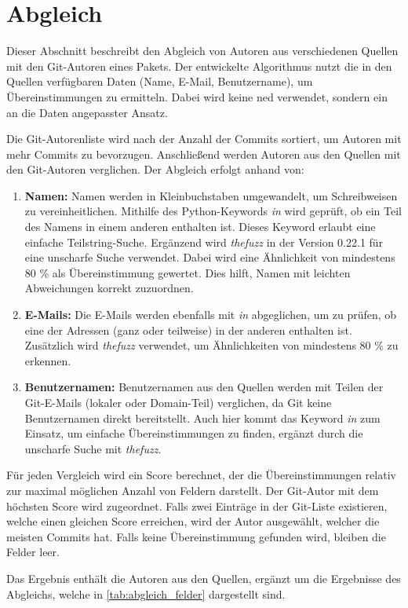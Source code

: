 \section{Abgleich}
\label{sec:abgleich}
Dieser Abschnitt beschreibt den Abgleich von Autoren aus verschiedenen Quellen mit den Git-Autoren eines Pakets.
Der entwickelte Algorithmus nutzt die in den Quellen verfügbaren Daten (Name, E-Mail, Benutzername), um Übereinstimmungen zu ermitteln.
Dabei wird keine \gls{ned} verwendet, sondern ein an die Daten angepasster Ansatz.

Die Git-Autorenliste wird nach der Anzahl der Commits sortiert, um Autoren mit mehr Commits zu bevorzugen.
Anschließend werden Autoren aus den Quellen mit den Git-Autoren verglichen. Der Abgleich erfolgt anhand von:

\begin{enumerate}
    \item \textbf{Namen:} Namen werden in Kleinbuchstaben umgewandelt, um Schreibweisen zu vereinheitlichen. Mithilfe des Python-Keywords \emph{in} wird geprüft, ob ein Teil des Namens in einem anderen enthalten ist. Dieses Keyword erlaubt eine einfache Teilstring-Suche. Ergänzend wird \emph{thefuzz} in der Version 0.22.1 für eine unscharfe Suche verwendet. Dabei wird eine Ähnlichkeit von mindestens 80 \% als Übereinstimmung gewertet. Dies hilft, Namen mit leichten Abweichungen korrekt zuzuordnen.
    \item \textbf{E-Mails:} Die E-Mails werden ebenfalls mit \emph{in} abgeglichen, um zu prüfen, ob eine der Adressen (ganz oder teilweise) in der anderen enthalten ist. Zusätzlich wird \emph{thefuzz} verwendet, um Ähnlichkeiten von mindestens 80 \% zu erkennen.
    \item \textbf{Benutzernamen:} Benutzernamen aus den Quellen werden mit Teilen der Git-E-Mails (lokaler oder Domain-Teil) verglichen, da Git keine Benutzernamen direkt bereitstellt. Auch hier kommt das Keyword \emph{in} zum Einsatz, um einfache Übereinstimmungen zu finden, ergänzt durch die unscharfe Suche mit \emph{thefuzz}.
\end{enumerate}

Für jeden Vergleich wird ein Score berechnet, der die Übereinstimmungen relativ zur maximal möglichen Anzahl von Feldern darstellt.
Der Git-Autor mit dem höchsten Score wird zugeordnet.
Falls zwei Einträge in der Git-Liste existieren, welche einen gleichen Score erreichen, wird der Autor ausgewählt, welcher die meisten Commits hat.
Falls keine Übereinstimmung gefunden wird, bleiben die Felder leer.

Das Ergebnis enthält die Autoren aus den Quellen, ergänzt um die Ergebnisse des Abgleichs, welche in \autoref{tab:abgleich_felder} dargestellt sind.
